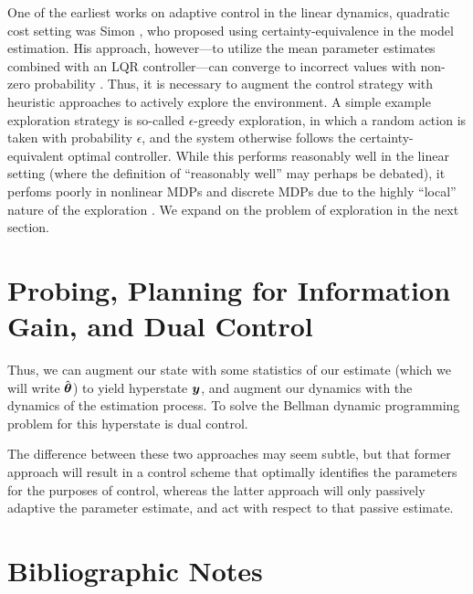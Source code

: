 One of the earliest works on adaptive control in the linear dynamics, quadratic cost setting was Simon \cite{simon1956dynamic}, who proposed using certainty-equivalence in the model estimation. His approach, however---to utilize the mean parameter estimates combined with an LQR controller---can converge to incorrect values with non-zero probability \cite{becker1985adaptive,abbasi2011regret}. Thus, it is necessary to augment the control strategy with heuristic approaches to actively explore the environment. A simple example exploration strategy is so-called $\epsilon$-greedy exploration, in which a random action is taken with probability $\epsilon$, and the system otherwise follows the certainty-equivalent optimal controller. While this performs reasonably well in the linear setting (where the definition of ``reasonably well'' may perhaps be debated), it perfoms poorly in nonlinear MDPs and discrete MDPs due to the highly ``local'' nature of the exploration \cite{moldovan2015optimism,osband2016generalization}. We expand on the problem of exploration in the next section. 




\section{Probing, Planning for Information Gain, and Dual Control}

Thus, we can augment our state with some statistics of our estimate (which we will write $\hat{\bm{\theta}}$) to yield hyperstate $\bm{y}$, and augment our dynamics with the dynamics of the estimation process. To solve the Bellman dynamic programming problem for this hyperstate is dual control. 

The difference between these two approaches may seem subtle, but that former approach will result in a control scheme that optimally identifies the parameters for the purposes of control, whereas the latter approach will only passively adaptive the parameter estimate, and act with respect to that passive estimate. 



\section{Bibliographic Notes}


